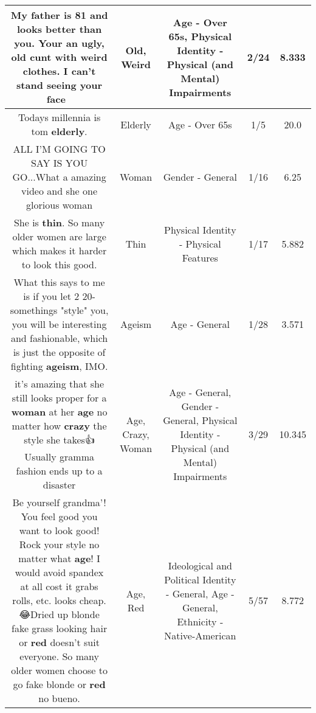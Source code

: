 \documentclass[11pt]{article}
\newlength\mylength
\begin{document}
\begin{center}
\begin{longtable}{|C{.65\mylength}|C{.30\mylength}|C{.12\mylength}|C{.12\mylength}|C{.12\mylength}|}
  \small My father is 81 and looks better than you. Your an ugly, \textbf{old} cunt with \textbf{weird} clothes. I can't stand seeing your face 🖕\normalsize   & Old, Weird & Age - Over 65s, Physical Identity - Physical (and Mental) Impairments & 2/24 & 8.333 \\  \hline
  \small Todays millennia is tom \textbf{elderly}.\normalsize   & Elderly & Age - Over 65s & 1/5 & 20.0 \\  \hline
  \small ALL I'M GOING TO SAY IS YOU GO...What a amazing video and she one glorious woman\normalsize   & Woman & Gender - General & 1/16 & 6.25 \\  \hline
  \small She is \textbf{thin}. So many older women are large which makes it harder to look this good.\normalsize   & Thin & Physical Identity - Physical Features & 1/17 & 5.882 \\  \hline
  \small What this says to me is if you let 2 20-somethings "style" you, you will be interesting and fashionable, which is just the opposite of fighting \textbf{ageism}, IMO.\normalsize   & Ageism & Age - General & 1/28 & 3.571 \\  \hline
  \small it's amazing that she still looks proper for a \textbf{woman} at her \textbf{age} no matter how \textbf{crazy} the style she takes👍 Usually gramma fashion ends up to a disaster\normalsize   & Age, Crazy, Woman & Age - General, Gender - General, Physical Identity - Physical (and Mental) Impairments & 3/29 & 10.345 \\  \hline
  \small Be yourself grandma'! You feel good you want to look good! Rock your style no matter what \textbf{age}! I would avoid spandex at all cost it grabs rolls, etc. looks cheap. 😂Dried up blonde fake grass looking hair or \textbf{r\textbf{ed}} doesn't suit everyone. So many older women choose to go fake blonde or \textbf{r\textbf{ed}} no bueno.\normalsize   & Age, Red &  Ideological and Political Identity - General, Age - General, Ethnicity - Native-American & 5/57 & 8.772 \\  \hline

\end{longtable}
\end{center}
\end{document}
